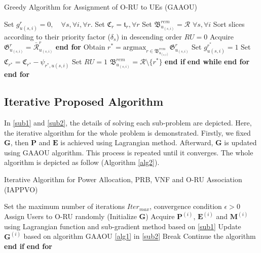 \documentclass[conference]{IEEEtran}
\begin{document}
\begin{algorithm}
\caption{Greedy Algorithm for Assignment of O-RU to UEs (GAAOU)}\label{alg1}
\begin{algorithmic}[1]
\State Set $g^r_{u(s,i)} = 0, \quad \forall s, \forall i, \forall r$.\label{31}
\State Set $\mathfrak{C}_r = \mathfrak{t}_r, \forall r$  \label{32}
\State Set ${\mathfrak{B}}^{rem}_{u_{(s,i)}} = \mathcal{R}$  $\forall s, \forall i$
\State Sort slices according to their priority factor ($\delta_s$) in descending order
\label{33}
\State $RU = 0$
\State Acquire $\mathfrak{G}^r_{u_{(s,i)}} = \bar{\mathcal{R}}^r_{u_{(s,i)}}$
\EndFor
\State \textbf{end for}
\State Obtain $r^* = \text{argmax}_{r\in{\mathfrak{B}}^{rem}_{u_{(s,i)}}} \mathfrak{G}^r_{u_{(s,i)}}$
\State Set $g^{r^*}_{u(s,i)} = 1$ 
\State Set  $\mathfrak{C}_{r^*} = \mathfrak{C}_{r^*} - \psi_{{r^*},u(s,i)}$
\State Set $RU = 1$ 
\Else
\State  ${\mathfrak{B}}^{rem}_{u_{(s,i)}} = \mathcal{R} \setminus \{{r^*}\} $
\EndIf
\State \textbf{end if}
\EndWhile
\State \textbf{end while}
\EndFor
\State \textbf{end for}
\EndFor
\State \textbf{end for} \label{34}
\end{algorithmic}
\end{algorithm} 
\subsection{Iterative Proposed Algorithm}
In \eqref{sub1} and \eqref{sub2}, the details of solving each sub-problem are depicted. 
Here, the iterative algorithm for the whole problem is demonstrated.
Firstly, we fixed $\boldsymbol{G}$, then $\boldsymbol{P}$ and $\boldsymbol{E}$ is achieved using Lagrangian method.  
Afterward, $\boldsymbol{G}$ is updated using GAAOU algorithm. This process is repeated until it converges. 
The whole algorithm is depicted as follow (Algorithm \eqref{alg2}).
 \begin{algorithm}
\caption{Iterative Algorithm for Power Allocation, PRB, VNF and O-RU Association (IAPPVO)}\label{alg2}
\begin{algorithmic}[1]
\State  Set the maximum number of iterations ${Iter}_{max}$, convergence condition $\epsilon > 0$ \label{a21}
\State  Assign Users to O-RU randomly (Initialize $\boldsymbol{G}$) \label{a22}
\label{23}
\State Acquire $\boldsymbol{P}^{(i)}$, $\boldsymbol{E}^{(i)}$ and $\boldsymbol{M}^{(i)}$ using Lagrangian function and sub-gradient method based on \eqref{sub1}
\State Update $\boldsymbol{G}^{(i)}$   based on algorithm GAAOU \eqref{alg1} in  \eqref{sub2}
\State Break
\Else 
\State Continue the algorithm  
\EndIf
\State \textbf{end if}
\EndFor
\State \textbf{end for} \label{24}
\end{algorithmic}
\end{algorithm}
\end{document}
